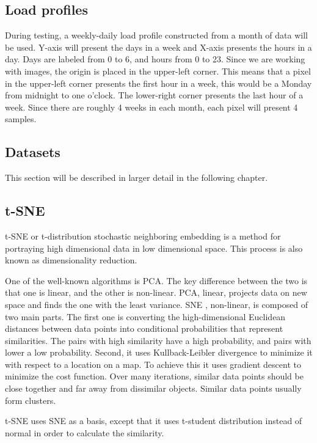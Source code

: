 \subsection{Load profiles}

During testing, a weekly-daily load profile constructed from a month of data will be used.
Y-axis will present the days in a week and X-axis presents the hours in a day.
Days are labeled from 0 to 6, and hours from 0 to 23.
Since we are working with images, the origin is placed in the upper-left corner. 
This means that a pixel in the upper-left corner presents the first hour in a week,
this would be a Monday from midnight to one o'clock. 
The lower-right corner presents the last hour of a week.
Since there are roughly 4 weeks in each month, each pixel will present 4 samples. 



\subsection{Datasets}
This section will be described in larger detail in the following chapter.

\subsection{t-SNE}

t-SNE \cite{tsne2} or t-distribution stochastic neighboring embedding is a method for portraying high dimensional 
data in low dimensional space. This process is also known as dimensionality reduction.

One of the well-known algorithms is PCA.
The key difference between the two is that one is linear, and the other is non-linear.
PCA, linear, projects data on new space and finds the one with the least variance.
SNE \cite{sne1}, non-linear, is composed of two main parts. The first one is 
converting the high-dimensional Euclidean distances between data points into conditional probabilities that represent similarities. \cite{sne1}
The pairs with high similarity have a high probability, and pairs with lower a low probability.
Second, it uses Kullback-Leibler divergence to minimize it with respect to a location on a map.
To achieve this it uses gradient descent to minimize the cost function.
Over many iterations, similar data points should be close together and far away from dissimilar objects.
Similar data points usually form clusters. 

t-SNE uses SNE as a basis, except that it uses t-student distribution instead of normal in order to calculate the similarity.

